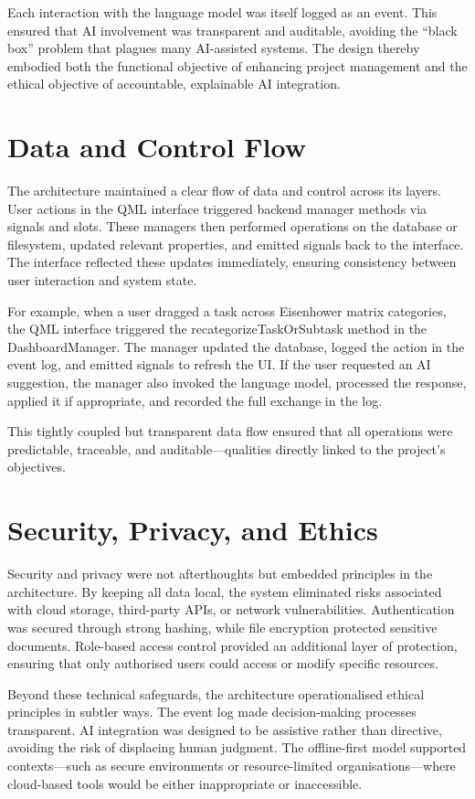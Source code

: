 \documentclass{report}
\begin{document}
Each interaction with the language model was itself logged as an event. 
This ensured that AI involvement was transparent and auditable, avoiding the “black box” problem that plagues many AI-assisted systems. 
The design thereby embodied both the functional objective of enhancing project management and the ethical objective of accountable, explainable AI integration.

\section{Data and Control Flow}

The architecture maintained a clear flow of data and control across its layers. 
User actions in the QML interface triggered backend manager methods via signals and slots. 
These managers then performed operations on the database or filesystem, updated relevant properties, and emitted signals back to the interface. 
The interface reflected these updates immediately, ensuring consistency between user interaction and system state.

For example, when a user dragged a task across Eisenhower matrix categories, the QML interface triggered the recategorizeTaskOrSubtask method in the DashboardManager. 
The manager updated the database, logged the action in the event log, and emitted signals to refresh the UI. 
If the user requested an AI suggestion, the manager also invoked the language model, processed the response, applied it if appropriate, and recorded the full exchange in the log.

This tightly coupled but transparent data flow ensured that all operations were predictable, traceable, and auditable—qualities directly linked to the project's objectives.

\section{Security, Privacy, and Ethics}

Security and privacy were not afterthoughts but embedded principles in the architecture. 
By keeping all data local, the system eliminated risks associated with cloud storage, third-party APIs, or network vulnerabilities. 
Authentication was secured through strong hashing, while file encryption protected sensitive documents. 
Role-based access control provided an additional layer of protection, ensuring that only authorised users could access or modify specific resources.

Beyond these technical safeguards, the architecture operationalised ethical principles in subtler ways. 
The event log made decision-making processes transparent. 
AI integration was designed to be assistive rather than directive, avoiding the risk of displacing human judgment. 
The offline-first model supported contexts—such as secure environments or resource-limited organisations—where cloud-based tools would be either inappropriate or inaccessible.
\end{document}
